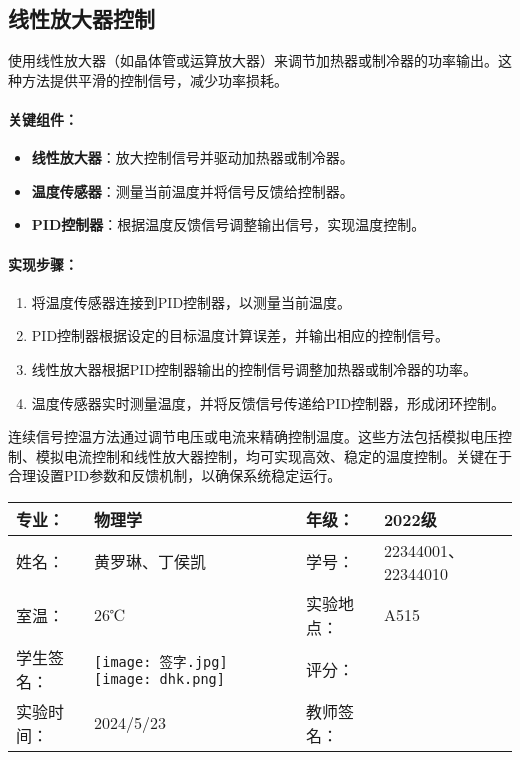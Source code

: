 \documentclass[dvipsnames, svgnames,a4paper,11pt]{article}
\begin{document}
\subsection*{线性放大器控制}

使用线性放大器（如晶体管或运算放大器）来调节加热器或制冷器的功率输出。这种方法提供平滑的控制信号，减少功率损耗。

\paragraph*{关键组件：}
\begin{itemize}
    \item \textbf{线性放大器}：放大控制信号并驱动加热器或制冷器。
    \item \textbf{温度传感器}：测量当前温度并将信号反馈给控制器。
    \item \textbf{PID控制器}：根据温度反馈信号调整输出信号，实现温度控制。
\end{itemize}

\paragraph*{实现步骤：}
\begin{enumerate}
    \item 将温度传感器连接到PID控制器，以测量当前温度。
    \item PID控制器根据设定的目标温度计算误差，并输出相应的控制信号。
    \item 线性放大器根据PID控制器输出的控制信号调整加热器或制冷器的功率。
    \item 温度传感器实时测量温度，并将反馈信号传递给PID控制器，形成闭环控制。
\end{enumerate}


连续信号控温方法通过调节电压或电流来精确控制温度。这些方法包括模拟电压控制、模拟电流控制和线性放大器控制，均可实现高效、稳定的温度控制。关键在于合理设置PID参数和反馈机制，以确保系统稳定运行。

	\clearpage
	
	\begin{table}
		\renewcommand\arraystretch{1.7}
		\centering
		\begin{tabularx}{\textwidth}{|X|X|X|X|}
			\hline
			专业： & 物理学 & 年级： & 2022级 \\
			\hline
			姓名： & 黄罗琳、丁侯凯 & 学号： &22344001、22344010 \\
			\hline
			室温： &26℃  & 实验地点： & A515 \\
			\hline
			学生签名：&\texttt{[image: 签字.jpg]} \texttt{[image: dhk.png]}  & 评分： &\\
			\hline
			实验时间：& 2024/5/23 & 教师签名：&\\
			\hline
		\end{tabularx}
	\end{table}
	
\end{document}

